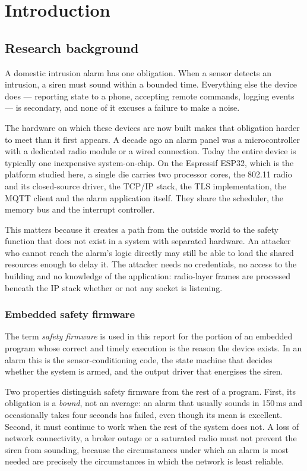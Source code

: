 \chapter{Introduction}\label{ch:intro}

\section{Research background}

A domestic intrusion alarm has one obligation. When a sensor detects an intrusion, a siren must
sound within a bounded time. Everything else the device does — reporting state to a phone,
accepting remote commands, logging events — is secondary, and none of it excuses a failure to
make a noise.

The hardware on which these devices are now built makes that obligation harder to meet than it
first appears. A decade ago an alarm panel was a microcontroller with a dedicated radio module
or a wired connection. Today the entire device is typically one inexpensive
system-on-chip. On the Espressif ESP32, which is the platform studied here, a single die carries
two processor cores, the 802.11 radio and its closed-source driver, the TCP/IP stack, the TLS
implementation, the MQTT client and the alarm application itself. They share the scheduler, the
memory bus and the interrupt controller.

This matters because it creates a path from the outside world to the safety function that does
not exist in a system with separated hardware. An attacker who cannot reach the alarm's logic
directly may still be able to load the shared resources enough to delay it. The attacker needs
no credentials, no access to the building and no knowledge of the application: radio-layer
frames are processed beneath the IP stack whether or not any socket is listening.

\subsection{Embedded safety firmware}

The term \emph{safety firmware} is used in this report for the portion of an embedded program
whose correct and timely execution is the reason the device exists. In an alarm this is the
sensor-conditioning code, the state machine that decides whether the system is armed, and the
output driver that energises the siren.

Two properties distinguish safety firmware from the rest of a program. First, its obligation is
a \emph{bound}, not an average: an alarm that usually sounds in 150\,ms and occasionally takes
four seconds has failed, even though its mean is excellent. Second, it must continue to work
when the rest of the system does not. A loss of network connectivity, a broker outage or a
saturated radio must not prevent the siren from sounding, because the circumstances under which
an alarm is most needed are precisely the circumstances in which the network is least reliable.

